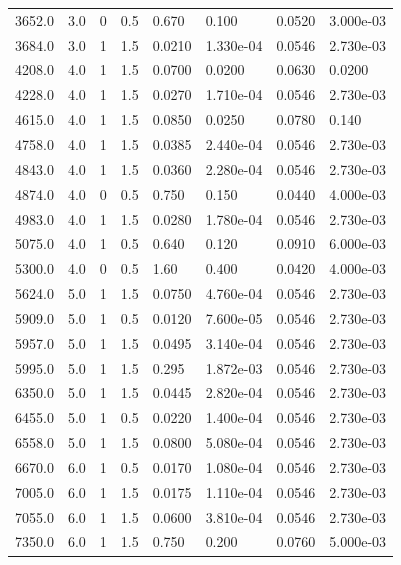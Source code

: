 \documentclass[preview]{standalone}
\begin{document}
{{\begin{tabular}{L{1.2cm}C{1.2cm} C{0.3cm}C{0.5cm} C{1.4cm}C{1.4cm} C{1.4cm}C{1.4cm}}
  3652.0  &   3.0  & 0     & 0.5 &  0.670  & 0.100  & 0.0520 &  3.000e-03   \\ 
  3684.0  &   3.0  & 1     & 1.5 &  0.0210  & 1.330e-04  & 0.0546 &  2.730e-03   \\ 
  4208.0  &   4.0  & 1     & 1.5 &  0.0700  & 0.0200  & 0.0630 &  0.0200   \\ 
  4228.0  &   4.0  & 1     & 1.5 &  0.0270  & 1.710e-04  & 0.0546 &  2.730e-03   \\ 
  4615.0  &   4.0  & 1     & 1.5 &  0.0850  & 0.0250  & 0.0780 &  0.140   \\ 
  4758.0  &   4.0  & 1     & 1.5 &  0.0385  & 2.440e-04  & 0.0546 &  2.730e-03   \\ 
  4843.0  &   4.0  & 1     & 1.5 &  0.0360  & 2.280e-04  & 0.0546 &  2.730e-03   \\ 
  4874.0  &   4.0  & 0     & 0.5 &  0.750  & 0.150  & 0.0440 &  4.000e-03   \\ 
  4983.0  &   4.0  & 1     & 1.5 &  0.0280  & 1.780e-04  & 0.0546 &  2.730e-03   \\ 
  5075.0  &   4.0  & 1     & 0.5 &  0.640  & 0.120  & 0.0910 &  6.000e-03   \\ 
  5300.0  &   4.0  & 0     & 0.5 &  1.60  & 0.400  & 0.0420 &  4.000e-03   \\ 
  5624.0  &   5.0  & 1     & 1.5 &  0.0750  & 4.760e-04  & 0.0546 &  2.730e-03   \\ 
  5909.0  &   5.0  & 1     & 0.5 &  0.0120  & 7.600e-05  & 0.0546 &  2.730e-03   \\ 
  5957.0  &   5.0  & 1     & 1.5 &  0.0495  & 3.140e-04  & 0.0546 &  2.730e-03   \\ 
  5995.0  &   5.0  & 1     & 1.5 &  0.295  & 1.872e-03  & 0.0546 &  2.730e-03   \\ 
  6350.0  &   5.0  & 1     & 1.5 &  0.0445  & 2.820e-04  & 0.0546 &  2.730e-03   \\ 
  6455.0  &   5.0  & 1     & 0.5 &  0.0220  & 1.400e-04  & 0.0546 &  2.730e-03   \\ 
  6558.0  &   5.0  & 1     & 1.5 &  0.0800  & 5.080e-04  & 0.0546 &  2.730e-03   \\ 
  6670.0  &   6.0  & 1     & 0.5 &  0.0170  & 1.080e-04  & 0.0546 &  2.730e-03   \\ 
  7005.0  &   6.0  & 1     & 1.5 &  0.0175  & 1.110e-04  & 0.0546 &  2.730e-03   \\ 
  7055.0  &   6.0  & 1     & 1.5 &  0.0600  & 3.810e-04  & 0.0546 &  2.730e-03   \\ 
  7350.0  &   6.0  & 1     & 1.5 &  0.750  & 0.200  & 0.0760 &  5.000e-03   \\ 

\end{tabular}}}
\end{document}
